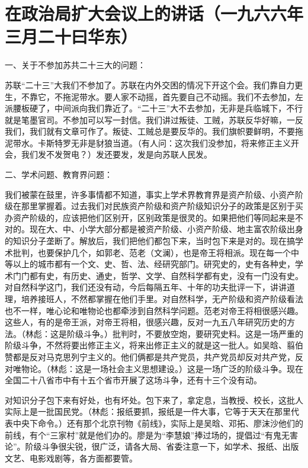 \section[在政治局扩大会议上的讲话（一九六六年三月二十曰华东）]{在政治局扩大会议上的讲话（一九六六年三月二十曰华东）}


一、关于不参加苏共二十三大的问题：

苏联“二十三”大我们不参加了。苏联在内外交困的情况下开这个会。我们靠自力更生，不靠它，不拖泥带水。要人家不动摇，首先要自己不动摇。我们不去参加，左派腰板硬了，中间派向我们靠近了。“二十三”大不去参加，无非是兵临城下，不行就是笔墨官司。不参加可以写一封信。我们讲过叛徒、工贼，苏联反华好嘛，一反我们，我们就有文章可作了。叛徒、工贼总是要反华的。我们旗帜要鲜明，不要拖泥带水。卡斯特罗无非是豺狼当道。（有人问：这次我们没参加，将来修正主义开会，我们发不发贺电？）发还要发，发是向苏联人民发。

二、学术问题、教育界问题：

我们被蒙在鼓里，许多事情都不知道，事实上学术界教育界是资产阶级、小资产阶级在那里掌握着。过去我们对民族资产阶级和资产阶级知识分子的政策是区别于买办资产阶级的，应该把他们区别开，区别政策是很灵的。如果把他们等同起来是不对的。现在大、中、小学大部分都是被资产阶级、小资产阶级、地主富农阶级出身的知识分子垄断了。解放后，我们把他们都包下来，当时包下来是对的。现在搞学术批判，也要保护几个，如郭老、范老（文澜），也是帝王将相派。现在每一个中等以上的城市都有一个文、史、哲、法、经研究部门。研究史的，史有各种史，学术门门都有史，有历史、通史，哲学、文学、自然科学都有史，没有一门没有史。对自然科学这门，我们还没有动，今后每隔五年、十年的功夫批评一下，讲讲道理，培养接班人，不然都掌握在他们手里。对自然科学，无产阶级和资产阶级看法也不一样，唯心论和唯物论也都牵涉到自然科学问题。范老对帝王将相很感兴趣。这些人，有的是帝王派，对帝王将相，很感兴趣，反对一九五八年研究历史的方法。（林彪：这是阶级斗争。）批判时，不要放空炮，要研究史料。这是一场严重的阶级斗争，不然将要出修正主义，将来出修正主义的就是这一批人。如吴晗、翦伯赞都是反对马克思列宁主义的。他们俩都是共产党员，共产党员却反对共产党，反对唯物论。（林彪：这是一场社会主义思想建设。）这是一场广泛的阶级斗争。现在全国二十八省市中有十五个省市开展了这场斗争，还有十三个没有动。

对知识分子包下来有好处，也有坏处。包下来了，拿定息，当教授、校长，这批人实际上是一批国民党。（林彪：报纸要抓，报纸是一件大事，它等于天天在那里代表中央下命令。）还有那个北京刊物《前线》，实际上是吴晗、邓拓、廖沫沙他们的前线，有个“三家村”就是他们办的。廖是为“李慧娘”捧过场的，提倡过“有鬼无害论”。阶级斗争很尖锐，很广泛，请各大局、省委注意一下，如学术、报纸、出版文艺、电影戏剧等，各方面都要管。

